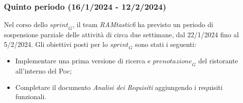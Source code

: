 \subsubsection{Quinto periodo (16/1/2024 - 12/2/2024)}
Nel corso dello $\textit{sprint}_G$, il team \emph{RAMtastic6} ha previsto un periodo di sospensione parziale delle attività di circa due settimane, dal 22/1/2024 fino al 5/2/2024.
Gli obiettivi posti per lo $\textit{sprint}_G$ sono stati i seguenti:
\begin{itemize}
    \item Implementare una prima versione di ricerca e $\textit{prenotazione}_G$ del ristorante all'interno del Poc;
    \item Completare il documento \emph{Analisi dei Requisiti} aggiungendo i requisiti funzionali.
\end{itemize}

